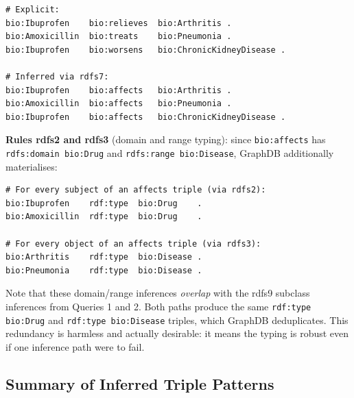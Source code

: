 \documentclass[11pt,a4paper]{article}
\begin{document}
\begin{lstlisting}[style=turtle]
# Explicit:
bio:Ibuprofen    bio:relieves  bio:Arthritis .
bio:Amoxicillin  bio:treats    bio:Pneumonia .
bio:Ibuprofen    bio:worsens   bio:ChronicKidneyDisease .

# Inferred via rdfs7:
bio:Ibuprofen    bio:affects   bio:Arthritis .
bio:Amoxicillin  bio:affects   bio:Pneumonia .
bio:Ibuprofen    bio:affects   bio:ChronicKidneyDisease .
\end{lstlisting}

\textbf{Rules rdfs2 and rdfs3} (domain and range typing): since
\texttt{bio:affects} has \texttt{rdfs:domain bio:Drug} and
\texttt{rdfs:range bio:Disease}, GraphDB additionally materialises:

\begin{lstlisting}[style=turtle]
# For every subject of an affects triple (via rdfs2):
bio:Ibuprofen    rdf:type  bio:Drug    .
bio:Amoxicillin  rdf:type  bio:Drug    .

# For every object of an affects triple (via rdfs3):
bio:Arthritis    rdf:type  bio:Disease .
bio:Pneumonia    rdf:type  bio:Disease .
\end{lstlisting}

Note that these domain/range inferences \emph{overlap} with the rdfs9 subclass
inferences from Queries 1 and 2.  Both paths produce the same
\texttt{rdf:type bio:Drug} and \texttt{rdf:type bio:Disease} triples, which
GraphDB deduplicates.  This redundancy is harmless and actually desirable: it
means the typing is robust even if one inference path were to fail.

\newpage

\subsection{Summary of Inferred Triple Patterns}
\end{document}
